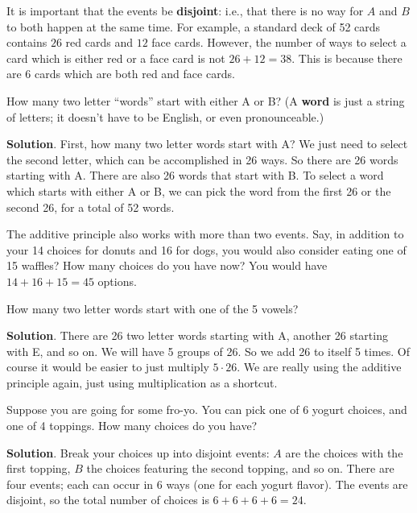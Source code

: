 \documentclass[11pt,]{book}
\newcommand{\terminology}[1]{\textbf{#1}}
\theoremstyle{ptxplainnotitle}
\theoremstyle{ptxplaintitle}
\theoremstyle{ptxdefinitionnotitle}
\theoremstyle{ptxdefinitiontitle}
\theoremstyle{ptxdefinitionnotitle}
\theoremstyle{ptxdefinitiontitle}
\theoremstyle{ptxdefinitionnotitle}
\theoremstyle{ptxdefinitiontitle}
\theoremstyle{ptxdefinitiontitlenonumber}
\theoremstyle{ptxdefinitiontitlenonumber}
\numberwithin{equation}{chapter}
\begin{document}
\hypertarget{p-966}{}%
It is important that the events be \terminology{disjoint}: i.e., that there is no way for \(A\) and \(B\) to both happen at the same time. For example, a standard deck of 52 cards contains \(26\) red cards and \(12\) face cards. However, the number of ways to select a card which is either red or a face card is not \(26 + 12 = 38\). This is because there are 6 cards which are both red and face cards.%
\begin{example}\label{example-34}
\hypertarget{p-967}{}%
How many two letter ``words'' start with either A or B? (A \terminology{word} is just a string of letters; it doesn't have to be English, or even pronounceable.)%
\par\smallskip%
\noindent\textbf{Solution}.\hypertarget{solution-124}{}\quad%
\hypertarget{p-968}{}%
First, how many two letter words start with A? We just need to select the second letter, which can be accomplished in 26 ways. So there are 26 words starting with A. There are also 26 words that start with B. To select a word which starts with either A or B, we can pick the word from the first 26 or the second 26, for a total of 52 words.%
\end{example}
\hypertarget{p-969}{}%
The additive principle also works with more than two events. Say, in addition to your 14 choices for donuts and 16 for dogs, you would also consider eating one of 15 waffles? How many choices do you have now? You would have \(14 + 16 + 15 = 45\) options.%
\begin{example}\label{example-35}
\hypertarget{p-970}{}%
How many two letter words start with one of the 5 vowels?%
\par\smallskip%
\noindent\textbf{Solution}.\hypertarget{solution-125}{}\quad%
\hypertarget{p-971}{}%
There are 26 two letter words starting with A, another 26 starting with E, and so on. We will have 5 groups of 26. So we add 26 to itself 5 times. Of course it would be easier to just multiply \(5\cdot 26\). We are really using the additive principle again, just using multiplication as a shortcut.%
\end{example}
\begin{example}\label{example-36}
\hypertarget{p-972}{}%
Suppose you are going for some fro-yo. You can pick one of 6 yogurt choices, and one of 4 toppings. How many choices do you have?%
\par\smallskip%
\noindent\textbf{Solution}.\hypertarget{solution-126}{}\quad%
\hypertarget{p-973}{}%
Break your choices up into disjoint events: \(A\) are the choices with the first topping, \(B\) the choices featuring the second topping, and so on. There are four events; each can occur in 6 ways (one for each yogurt flavor). The events are disjoint, so the total number of choices is \(6 + 6 + 6 + 6 = 24\).%
\end{example}
\end{document}
